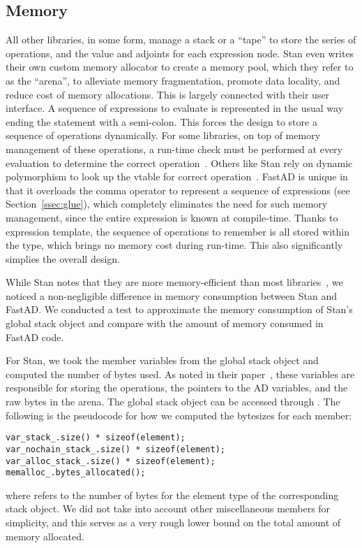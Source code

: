 \subsection{Memory} 

All other libraries, in some form, manage a stack or a ``tape''
to store the series of operations, and
the value and adjoints for each expression node.
Stan even writes their own custom memory allocator to create a memory pool,
which they refer to as the ``arena'', to alleviate memory fragmentation,
promote data locality, and reduce cost of memory allocations.
This is largely connected with their user interface.
A sequence of expressions to evaluate is represented 
in the usual way ending the statement with a semi-colon.
This forces the design to store a sequence of operations dynamically.
For some libraries, on top of memory management of these operations,
a run-time check must be performed at every evaluation to determine the correct operation~\cite{bell:2020}.
Others like Stan rely on dynamic polymorphism to look up the vtable for correct operation~\cite{carpenter:2015}.
FastAD is unique in that it overloads the comma operator to represent a sequence of expressions
(see Section~\ref{ssec:glue}), which completely eliminates the need for such memory management,
since the entire expression is known at compile-time.
Thanks to expression template, the sequence of operations to remember
is all stored within the type, which brings no memory cost during run-time.
This also significantly simplies the overall design.

While Stan notes that they are more memory-efficient than most libraries~\cite{carpenter:2015},
we noticed a non-negligible difference in memory consumption between Stan and FastAD.
We conducted a test to approximate the memory consumption of Stan's global stack object
and compare with the amount of memory consumed in FastAD code.

For Stan, we took the member variables
from the global stack object and computed the number of bytes used.
As noted in their paper~\cite{carpenter:2015}, these variables are responsible for storing
the operations, the pointers to the AD variables, and the raw bytes in the arena.
The global stack object can be accessed through .
The following is the pseudocode for how we computed the bytesizes for each member:
\begin{lstlisting}[style=customcpp]
var_stack_.size() * sizeof(element);
var_nochain_stack_.size() * sizeof(element);
var_alloc_stack_.size() * sizeof(element);
memalloc_.bytes_allocated();
\end{lstlisting}
where  refers to the number of bytes 
for the element type of the corresponding stack object.
We did not take into account other miscellaneous members for simplicity,
and this serves as a very rough lower bound on the total amount of memory allocated.

